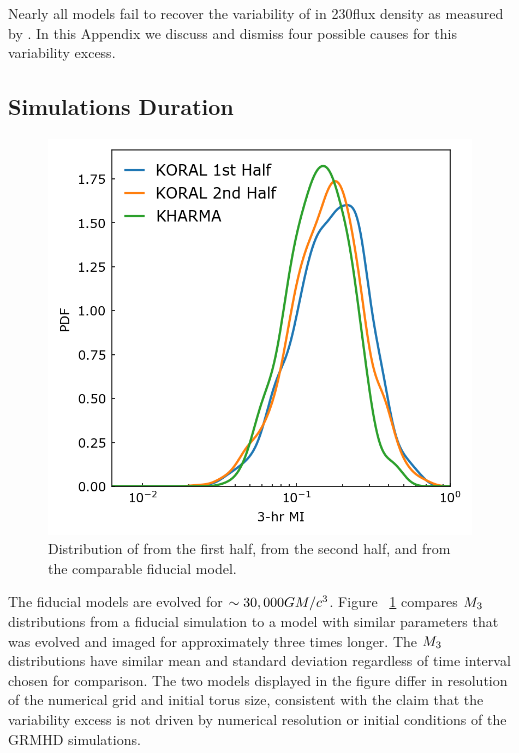 
Nearly all models fail to recover the variability of \sgra in 230\GHz flux density as measured by .
In this Appendix we discuss and dismiss four possible causes for this variability excess.

\subsection{Simulations Duration}\label{app:narayan}

\begin{figure}
  \centering
  \includegraphics[width=\columnwidth]{./figures/Koral_vs_IL_MI.png}
  \caption{Distribution of  from the \koral first half, from the second half, and from the comparable fiducial \kharma model.}
  \label{fig:koral_MI}
\end{figure}

The fiducial models are evolved for $\sim 30,000 GM/c^3$.
Figure ~\ref{fig:koral_MI} compares $M_{3}$ distributions from a fiducial \kharma simulation to a \koral model with similar parameters that was evolved and imaged for approximately three times longer.
The $M_{3}$ distributions have similar mean and standard deviation regardless of time interval chosen for comparison.
The two models displayed in the figure differ in resolution of the numerical grid and initial torus size, consistent with the claim that the variability excess is not driven by numerical resolution or initial conditions of the GRMHD simulations.

